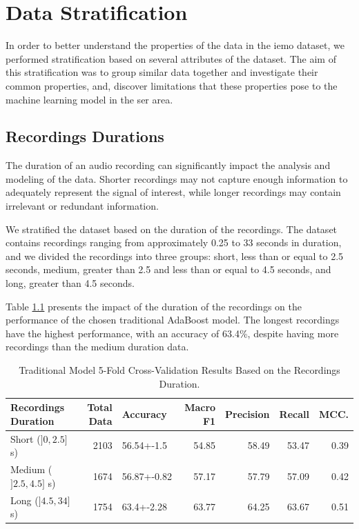 \chapter{Data Stratification}
\label{chapter:data_stratification}


In order to better understand the properties of the data in the \ac{iemo} dataset, we performed stratification based on several attributes of the dataset. The aim of this stratification was to group similar data together and investigate their common properties, and, discover limitations that these properties pose to the machine learning model in the \ac{ser} area.

\section{Recordings Durations}

The duration of an audio recording can significantly impact the analysis and modeling of the data. Shorter recordings may not capture enough information to adequately represent the signal of interest, while longer recordings may contain irrelevant or redundant information.

We stratified the dataset based on the duration of the recordings. The dataset contains recordings ranging from approximately 0.25 to 33 seconds in duration, and we divided the recordings into three groups: short, less than or equal to 2.5 seconds, medium, greater than 2.5 and less than or equal to 4.5 seconds, and long, greater than 4.5 seconds.

Table \ref{5:durations} presents the impact of the duration of the recordings on the performance of the chosen traditional AdaBoost model. The longest recordings have the highest performance, with an accuracy of 63.4\%, despite having more recordings than the medium duration data. 

\begin{table}[H]
	\centering
	\caption{Traditional Model 5-Fold Cross-Validation Results Based on the Recordings Duration.}
	\label{5:durations}
	\begin{tabular}{lrlrrrr}
		\toprule
		Recordings Duration &   Total Data & Accuracy    &   Macro F1 &   Precision &   Recall &   MCC. \\
		\midrule
		Short ($]0, 2.5]$ s)	&         2103 & 56.54+-1.5  &      54.85 &       58.49 &    53.47 &   0.39 \\
		Medium ($]2.5, 4.5]$ s)	& 		  1674 & 56.87+-0.82 &      57.17 &       57.79 &    57.09 &   0.42 \\
		Long ($]4.5, 34]$ s)	&         1754 & 63.4+-2.28  &      63.77 &       64.25 &    63.67 &   0.51 \\
		\bottomrule
	\end{tabular}
\end{table}

